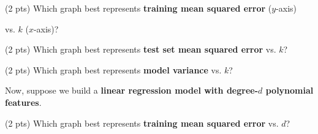 \documentclass[twoside,12pt]{article}
\begin{document}
\begin{probset}
\begin{prob}[(14 pts)]
\begin{subprobset}
\begin{subprob}(2 pts) Which graph best represents \textbf{training mean squared error} ($y$-axis)

vs. $k$ ($x$-axis)?







\end{subprob}

\begin{subprob}(2 pts) Which graph best represents \textbf{test set mean squared error} vs. $k$?




    


\end{subprob}

\begin{subprob}(2 pts) Which graph best represents \textbf{model variance} vs. $k$?




    

    
\end{subprob}

\end{subprobset}

Now, suppose we build a \textbf{linear regression model with degree-$d$ polynomial features}.

\begin{subprobset}

\begin{subprob}(2 pts) Which graph best represents \textbf{training mean squared error} vs. $d$?




    



\end{subprob}
\end{subprobset}
\end{prob}
\end{probset}
\end{document}
